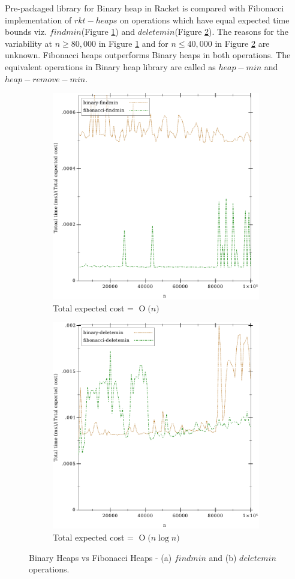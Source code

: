 \documentclass{llncs}
\newcommand{\BigO}[1]{\ensuremath{\operatorname{O}\bigl(#1\bigr)}}
\begin{document}
Pre-packaged library for Binary heap in Racket is compared with Fibonacci implementation of $rkt-heaps$ on operations which have equal expected time bounds viz. $findmin$(Figure \ref{fig:findmin}) and $deletemin$(Figure \ref{fig:deletemin}). The reasons for the variability at $n\ge80,000$ in Figure \ref{fig:findmin} and for $n\le40,000$ in Figure \ref{fig:deletemin} are unknown. Fibonacci heaps outperforms Binary heaps in both operations. The equivalent operations in Binary heap library are called as $heap-min$ and $heap-remove-min$.

\begin{figure}
	\begin{subfigure}{0.5\textwidth}
		\centering
		\includegraphics[width=0.8\linewidth]{FIG/findmin.pdf}
		\caption{Total expected cost = \BigO{n}}
		\label{fig:findmin}
	\end{subfigure}%
	\begin{subfigure}{0.5\textwidth}
		\centering
		\includegraphics[width=0.8\linewidth]{FIG/deletemin.pdf}
		\caption{Total expected cost = \BigO{n \log n}}
		\label{fig:deletemin}
	\end{subfigure}
	\caption{Binary Heaps vs Fibonacci Heaps - (a) $findmin$ and (b) $deletemin$ operations.}
	\label{fig:fi_bi_comp}
\end{figure}
\end{document}
